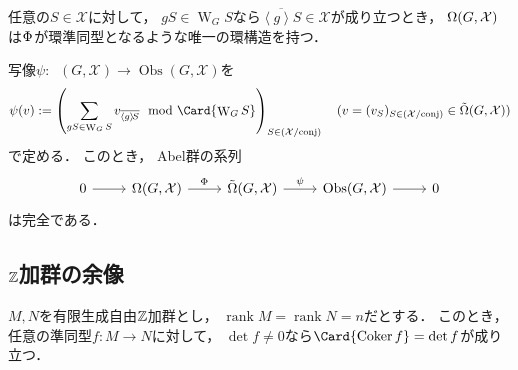 \documentclass{jlreq}
\DeclareMathOperator{\GhostRing}{\tilde{\Omega}}
\newcommand{\CompReps}[1]{\left(#1\right)}
\newcommand{\WeylGrp}[1][\relax]{\mathop{\mathrm{W}}\nolimits_{#1}}
\DeclareMathOperator{\ObsGrp}{Obs}
\newcommand{\GeneratedGrpBy}[1]{\left\langle #1 \right\rangle}
\DeclareMathOperator{\Rank}{rank}
\DeclareMathOperator{\Cok}{Coker}
\begin{document}
	\begin{theorem}
		任意の$S \in \mathcal{X}$に対して，
		$gS \in \WeylGrp[G]S$なら$\overline{\GeneratedGrpBy{g}\! S} \in \mathcal{X}$が成り立つとき，
		$\Omega(G, \mathcal{X})$は$\Phi_{\relax}$が環準同型となるような唯一の環構造を持つ．
	\end{theorem}
	
	\begin{theorem}
		写像$\psi \colon \GhostRing(G, \mathcal{X}) \to \ObsGrp(G, \mathcal{X})$を
		\begin{equation}
			\psi(v) := \left( \sum_{gS \in \WeylGrp[G]S} v_{\overline{\GeneratedGrpBy{g}\! S}} \mod \Card{\WeylGrp[G]S} \right)_{S \in \CompReps{\mathcal{X}/\mathrm{conj}}} \quad (v = (v_S)_{S \in \CompReps{\mathcal{X}/\mathrm{conj}}} \in \GhostRing(G, \mathcal{X}))
		\end{equation}
		で定める．
		このとき，
		Abel群の系列
		\begin{equation}
			\begin{tikzcd}
				0 \arrow[r] & {\BurnsideRing(G, \mathcal{X})} \arrow[r, "\MarkHom"] & {\GhostRing(G, \mathcal{X})} \arrow[r, "\psi"] & {\ObsGrp(G, \mathcal{X})} \arrow[r] & 0
			\end{tikzcd}
		\end{equation}
		は完全である．
	\end{theorem}

	\subsection{\texorpdfstring{$\mathbb{Z}$}{Z}加群の余像}
	
	\begin{proposition}
		$M, N$を有限生成自由$\mathbb{Z}$加群とし，
		$\Rank M = \Rank N = n$だとする．
		このとき，
		任意の準同型$f \colon M \to N$に対して，
		$\det f \ne 0$なら$\Card{\Cok f} = \det f$が成り立つ．
	\end{proposition}
	
\end{document}
